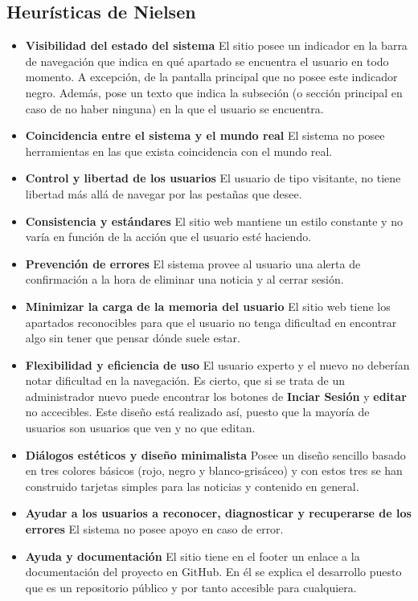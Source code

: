 \documentclass[10pt, spanish, pdftex]{template/UC3M_document}
\begin{document}
\subsection{Heurísticas de Nielsen}
  \begin{itemize}
    \item \textbf{Visibilidad del estado del sistema}
    El sitio posee un indicador en la barra de navegación que indica en qué apartado se encuentra el usuario en todo momento. A excepción, de la pantalla principal que no posee este indicador negro.
    Además, pose un texto que indica la subseción (o sección principal en caso de no haber ninguna) en la que el usuario se encuentra.

    \item \textbf{Coincidencia entre el sistema y el mundo real}
    El sistema no posee herramientas en las que exista coincidencia con el mundo real.

    \item \textbf{Control y libertad de los usuarios}
    El usuario de tipo visitante, no tiene libertad más allá de navegar por las pestañas que desee.

    \item \textbf{Consistencia y estándares}
    El sitio web mantiene un estilo constante y no varía en función de la acción que el usuario esté haciendo.

    \item \textbf{Prevención de errores}
    El sistema provee al usuario una alerta de confirmación a la hora de eliminar una noticia y al cerrar sesión.

    \item \textbf{Minimizar la carga de la memoria del usuario}
    El sitio web tiene los apartados reconocibles para que el usuario no tenga dificultad en encontrar algo sin tener que pensar dónde suele estar.

    \item \textbf{Flexibilidad y eficiencia de uso}
    El usuario experto y el nuevo no deberían notar dificultad en la navegación. Es cierto, que si se trata de un administrador nuevo puede encontrar los botones de \textbf{Inciar Sesión} y \textbf{editar} no accecibles. Este diseño está realizado así, puesto que la mayoría de usuarios son usuarios que ven y no que editan.

    \item \textbf{Diálogos estéticos y diseño minimalista}
    Posee un diseño sencillo basado en tres colores básicos (rojo, negro y blanco-grisáceo) y con estos tres se han construido tarjetas simples para las noticias y contenido en general.

    \item \textbf{Ayudar a los usuarios a reconocer, diagnosticar y recuperarse de los errores}
    El sistema no posee apoyo en caso de error.

    \item \textbf{Ayuda y documentación}
    El sitio tiene en el footer un enlace a la documentación del proyecto en GitHub. En él se explica el desarrollo puesto que es un repositorio público y por tanto accesible para cualquiera.
  \end{itemize}
\end{document}
